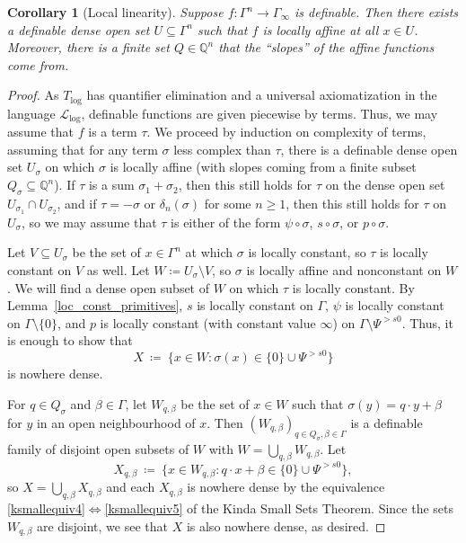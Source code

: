 \documentclass[11pt]{amsart}
\theoremstyle{plain}
\newtheorem{cor}[thm]{Corollary}
\theoremstyle{definition}
\numberwithin{equation}{section}
\newcommand\Q{\mathbb{Q}}
\newcommand\calL{\mathcal{L}}
\newcommand\0{\varnothing}
\begin{document}
\begin{cor}[Local linearity]\label{cor_locallin}
Suppose $f\colon\Gamma^n\to\Gamma_{\infty}$ is definable. Then there exists a definable dense open set $U\subseteq\Gamma^n$ such that $f$ is locally affine at all $x \in U$. 
Moreover, there is a finite set $Q\in\Q^n$ that the ``slopes'' of the affine functions come from.
\end{cor}
\begin{proof}
As $T_{\log}$ has quantifier elimination and a universal axiomatization in the language $\calL_{\log}$, definable functions are given piecewise by terms. Thus, we may assume that $f$ is a term $\tau$. We proceed by induction on complexity of terms, assuming that for any term $\sigma$ less complex than $\tau$, there is a definable dense open set $U_\sigma$ on which $\sigma$ is locally affine (with slopes coming from a finite subset $Q_\sigma \subseteq \Q^n$). If $\tau$ is a sum $\sigma_1+\sigma_2$, then this still holds for $\tau$ on the dense open set $U_{\sigma_1}\cap U_{\sigma_2}$, and if   $\tau = -\sigma$ or $\delta_n(\sigma)$ for some $n\geq 1$, then this still holds for $\tau$ on $U_\sigma$, so we may assume that $\tau$ is either of the form $\psi \circ \sigma$, $s\circ \sigma$, or $p \circ \sigma$.

Let $V\subseteq U_\sigma$ be the set of $x \in \Gamma^n$ at which $\sigma$ is locally constant, so $\tau$ is locally constant on $V$ as well. Let $W \coloneqq U_\sigma \setminus V$, so $\sigma$ is locally affine and nonconstant on $W$. We will find a dense open subset of $W$ on which $\tau$ is locally constant. By Lemma~\ref{loc_const_primitives}, $s$ is locally constant on $\Gamma$, $\psi$ is locally constant on $\Gamma \setminus \{0\}$, and $p$ is locally constant (with constant value $\infty$) on $\Gamma \setminus \Psi^{>s0}$. Thus, it is enough to show that 
\[
X\ \coloneqq\ \{x \in W: \sigma(x) \in \{0\} \cup \Psi^{>s0}\}
\]
is nowhere dense.

For $q \in Q_{\sigma}$ and $\beta \in \Gamma$, let $W_{q,\beta}$ be the set of $x \in W$ such that $\sigma(y) = q\cdot y+\beta$ for $y$ in  an open  neighbourhood of $x$. Then $(W_{q,\beta})_{q \in Q_\sigma,\beta \in \Gamma}$ is a definable family of disjoint open subsets of $W$ with $W = \bigcup_{q,\beta}W_{q,\beta}$. Let 
\[
X_{q,\beta}\ \coloneqq\ \{x \in W_{q,\beta}:q\cdot x +\beta\in \{0\}\cup \Psi^{>s0}\},
\]
so $X = \bigcup_{q,\beta}X_{q,\beta}$ and each $X_{q,\beta}$ is nowhere dense by the equivalence \eqref{ksmallequiv4}$\Leftrightarrow$\eqref{ksmallequiv5} of the Kinda Small Sets Theorem. Since the sets $W_{q,\beta}$ are disjoint, we see that $X$ is also nowhere dense, as desired.
\end{proof}
\end{document}

